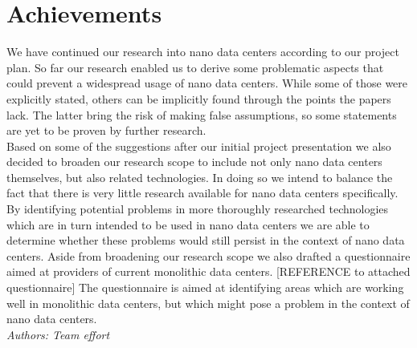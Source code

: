 \documentclass[sigchi-a, authorversion]{acmart}
\begin{document}
\section{Achievements}
We have continued our research into nano data centers according to our project plan. So far our research enabled us to derive some problematic aspects that could prevent a widespread usage of nano data centers. While some of those were explicitly stated, others can be implicitly found through the points the papers lack. The latter bring the risk of making false assumptions, so some statements are yet to be proven by further research. \\
Based on some of the suggestions after our initial project presentation we also decided to broaden our research scope to include not only nano data centers themselves, but also related technologies. In doing so we intend to balance the fact that there is very little research available for nano data centers specifically. By identifying potential problems in more thoroughly researched technologies which are in turn intended to be used in nano data centers we are able to determine whether these problems would still persist in the context of nano data centers.
Aside from broadening our research scope we also drafted a questionnaire aimed at providers of current monolithic data centers. [REFERENCE to attached questionnaire] The questionnaire is aimed at identifying areas which are working well in monolithic data centers, but which might pose a problem in the context of nano data centers.\\
\textit{Authors: Team effort}\\
\end{document}
